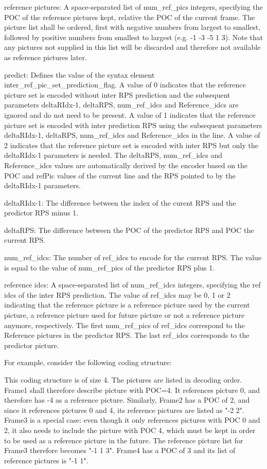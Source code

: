 \documentclass[a4paper,11pt]{jctvcdoc}
\begin{document}
reference pictures: A space-separated list of num_ref_pics integers,
specifying the POC of the reference pictures kept, relative the
POC of the current frame. The picture list shall be ordered,
first with negative numbers from largest to smallest, followed by
positive numbers from smallest to largest (e.g. -1 -3 -5 1 3).
Note that any pictures not supplied in this list will be
discarded and therefore not available as reference pictures
later.

predict: Defines the value of the syntax element
inter_ref_pic_set_prediction_flag. A value of 0 indicates that
the reference picture set is encoded without inter RPS prediction
and the subsequent parameters deltaRIdx-1, deltaRPS, num_ref_idcs
and Reference_idcs are ignored and do not need to be present. A
value of 1 indicates that the reference picture set is encoded
with inter prediction RPS using the subsequent parameters deltaRIdx-1,
deltaRPS, num_ref_idcs and Reference_idcs in the line. A value of 2
indicates that the reference picture set is encoded with inter RPS but
only the deltaRIdx-1 parameters is needed. The deltaRPS, num_ref_idcs and
Reference_idcs values are automatically derived by the encoder based on
the POC and refPic values of the current line and the RPS pointed to by
the deltaRIdx-1 parameters.

deltaRIdx-1: The difference between the index of the curent RPS
and the predictor RPS minus 1.

deltaRPS: The difference between the POC of the predictor RPS and
POC the current RPS.

num_ref_idcs: The number of ref_idcs to encode for the current RPS.
The value is equal to the value of  num_ref_pics of the predictor
RPS plus 1.

reference idcs: A space-separated list of num_ref_idcs integers,
specifying the ref idcs of the inter RPS prediction. The value of
ref_idcs may be 0, 1 or 2 indicating that the reference picture
is a reference picture used by the current picture, a reference
picture used for future picture or not a reference picture
anymore, respectively. The first num_ref_pics of ref_idcs correspond
to the Reference pictures in the predictor RPS. The last ref_idcs
corresponds to the predictor picture.

For example, consider the following coding structure:

This coding structure is of size 4. The pictures are listed in
decoding order. Frame1 shall therefore describe picture with
POC=4. It references picture 0, and therefore has -4 as a
reference picture. Similarly, Frame2 has a POC of 2, and since it
references pictures 0 and 4, its reference pictures are listed as
"-2 2". Frame3 is a special case: even though it only references
pictures with POC 0 and 2, it also needs to include the picture
with POC 4, which must be kept in order to be used as a reference
picture in the future. The reference picture list for Frame3
therefore becomes "-1 1 3". Frame4 has a POC of 3 and its list of
reference pictures is "-1 1".
\end{document}
